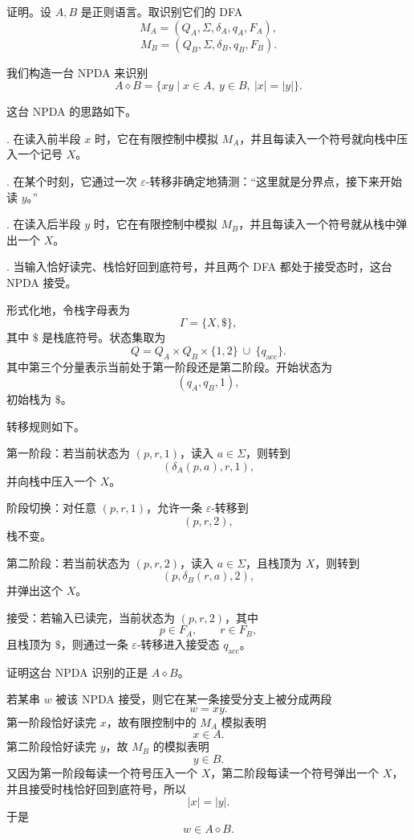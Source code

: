 \begin{answerred}
证明。设 $A,B$ 是正则语言。取识别它们的 DFA
\[
    M_A=(Q_A,\Sigma,\delta_A,q_A,F_A),
\]
\[
    M_B=(Q_B,\Sigma,\delta_B,q_B,F_B).
\]

我们构造一台 NPDA 来识别
\[
    A\diamond B=\{xy\mid x\in A,\ y\in B,\ |x|=|y|\}.
\]

这台 NPDA 的思路如下。

\medskip
{}. 在读入前半段 $x$ 时，它在有限控制中模拟 $M_A$，并且每读入一个符号就向栈中压入一个记号 $X$。

\medskip
{}. 在某个时刻，它通过一次 $\varepsilon$-转移非确定地猜测：“这里就是分界点，接下来开始读 $y$。”

\medskip
{}. 在读入后半段 $y$ 时，它在有限控制中模拟 $M_B$，并且每读入一个符号就从栈中弹出一个 $X$。

\medskip
{}. 当输入恰好读完、栈恰好回到底符号，并且两个 DFA 都处于接受态时，这台 NPDA 接受。

\medskip
形式化地，令栈字母表为
\[
    \Gamma=\{X,\$\},
\]
其中 $\$$ 是栈底符号。状态集取为
\[
    Q=Q_A\times Q_B\times \{1,2\}\ \cup\ \{q_{\mathrm{acc}}\}.
\]
其中第三个分量表示当前处于第一阶段还是第二阶段。开始状态为
\[
    (q_A,q_B,1),
\]
初始栈为 $\$$。

转移规则如下。

\medskip
\noindent
第一阶段：若当前状态为 $(p,r,1)$，读入 $a\in\Sigma$，则转到
\[
    (\delta_A(p,a),r,1),
\]
并向栈中压入一个 $X$。

\medskip
\noindent
阶段切换：对任意 $(p,r,1)$，允许一条 $\varepsilon$-转移到
\[
    (p,r,2),
\]
栈不变。

\medskip
\noindent
第二阶段：若当前状态为 $(p,r,2)$，读入 $a\in\Sigma$，且栈顶为 $X$，则转到
\[
    (p,\delta_B(r,a),2),
\]
并弹出这个 $X$。

\medskip
\noindent
接受：若输入已读完，当前状态为 $(p,r,2)$，其中
\[
    p\in F_A,\qquad r\in F_B,
\]
且栈顶为 $\$$，则通过一条 $\varepsilon$-转移进入接受态 $q_{\mathrm{acc}}$。

\medskip
证明这台 NPDA 识别的正是 $A\diamond B$。

若某串 $w$ 被该 NPDA 接受，则它在某一条接受分支上被分成两段
\[
    w=xy.
\]
第一阶段恰好读完 $x$，故有限控制中的 $M_A$ 模拟表明
\[
    x\in A.
\]
第二阶段恰好读完 $y$，故 $M_B$ 的模拟表明
\[
    y\in B.
\]
又因为第一阶段每读一个符号压入一个 $X$，第二阶段每读一个符号弹出一个 $X$，并且接受时栈恰好回到底符号，所以
\[
    |x|=|y|.
\]
于是
\[
    w\in A\diamond B.
\]


\end{answerred}
